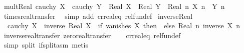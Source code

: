 \begin{isabellebody}
\endisatagproof
{\isafoldproof}%
%
\isadelimproof
\isanewline
%
\endisadelimproof
\isanewline
{}\isamarkupfalse%
\ mult{\isacharunderscore}{\kern0pt}Real{\isacharcolon}{\kern0pt}\ {\isachardoublequoteopen}cauchy\ X\ {\isasymLongrightarrow}\ cauchy\ Y\ {\isasymLongrightarrow}\ Real\ X\ {\isacharasterisk}{\kern0pt}\ Real\ Y\ {\isacharequal}{\kern0pt}\ Real\ {\isacharparenleft}{\kern0pt}{\isasymlambda}n{\isachardot}{\kern0pt}\ X\ n\ {\isacharasterisk}{\kern0pt}\ Y\ n{\isacharparenright}{\kern0pt}{\isachardoublequoteclose}\isanewline
%
\isadelimproof
\ \ %
\endisadelimproof
%
\isatagproof
{}\isamarkupfalse%
\ times{\isacharunderscore}{\kern0pt}real{\isachardot}{\kern0pt}transfer\ \isamarkupfalse%
\ {\isacharparenleft}{\kern0pt}simp\ add{\isacharcolon}{\kern0pt}\ cr{\isacharunderscore}{\kern0pt}real{\isacharunderscore}{\kern0pt}eq\ rel{\isacharunderscore}{\kern0pt}fun{\isacharunderscore}{\kern0pt}def{\isacharparenright}{\kern0pt}%
\endisatagproof
{\isafoldproof}%
%
\isadelimproof
\isanewline
%
\endisadelimproof
\isanewline
{}\isamarkupfalse%
\ inverse{\isacharunderscore}{\kern0pt}Real{\isacharcolon}{\kern0pt}\isanewline
\ \ {\isachardoublequoteopen}cauchy\ X\ {\isasymLongrightarrow}\ inverse\ {\isacharparenleft}{\kern0pt}Real\ X{\isacharparenright}{\kern0pt}\ {\isacharequal}{\kern0pt}\ {\isacharparenleft}{\kern0pt}if\ vanishes\ X\ then\ {}\ else\ Real\ {\isacharparenleft}{\kern0pt}{\isasymlambda}n{\isachardot}{\kern0pt}\ inverse\ {\isacharparenleft}{\kern0pt}X\ n{\isacharparenright}{\kern0pt}{\isacharparenright}{\kern0pt}{\isacharparenright}{\kern0pt}{\isachardoublequoteclose}\isanewline
%
\isadelimproof
\ \ %
\endisadelimproof
%
\isatagproof
{}\isamarkupfalse%
\ inverse{\isacharunderscore}{\kern0pt}real{\isachardot}{\kern0pt}transfer\ zero{\isacharunderscore}{\kern0pt}real{\isachardot}{\kern0pt}transfer\isanewline
\ \ \isamarkupfalse%
\ cr{\isacharunderscore}{\kern0pt}real{\isacharunderscore}{\kern0pt}eq\ rel{\isacharunderscore}{\kern0pt}fun{\isacharunderscore}{\kern0pt}def\ \isamarkupfalse%
\ {\isacharparenleft}{\kern0pt}simp\ split{\isacharcolon}{\kern0pt}\ if{\isacharunderscore}{\kern0pt}split{\isacharunderscore}{\kern0pt}asm{\isacharcomma}{\kern0pt}\ metis{\isacharparenright}{\kern0pt}%
\endisatagproof
{\isafoldproof}%
%
\isadelimproof
\isanewline
%
\endisadelimproof
\isanewline
{}\isamarkupfalse%
\isanewline
%
\isadelimproof
%
\endisadelimproof
%
\isatagproof
{}\isamarkupfalse%
\isanewline
\ \ \isamarkupfalse%

\end{isabellebody}
